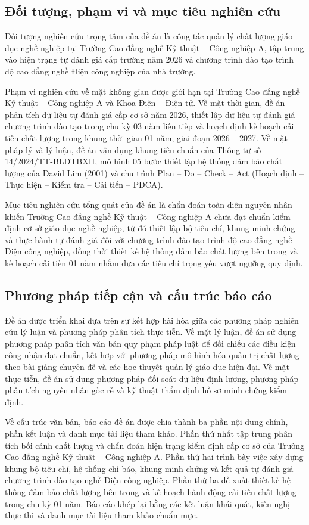 \subsection{Đối tượng, phạm vi và mục tiêu nghiên cứu}

Đối tượng nghiên cứu trọng tâm của đề án là công tác quản lý chất lượng giáo dục nghề nghiệp tại Trường Cao đẳng nghề Kỹ thuật -- Công nghiệp A, tập trung vào hiện trạng tự đánh giá cấp trường năm 2026 và chương trình đào tạo trình độ cao đẳng nghề Điện công nghiệp của nhà trường.

Phạm vi nghiên cứu về mặt không gian được giới hạn tại Trường Cao đẳng nghề Kỹ thuật -- Công nghiệp A và Khoa Điện -- Điện tử. Về mặt thời gian, đề án phân tích dữ liệu tự đánh giá cấp cơ sở năm 2026, thiết lập dữ liệu tự đánh giá chương trình đào tạo trong chu kỳ 03 năm liên tiếp và hoạch định kế hoạch cải tiến chất lượng trong khung thời gian 01 năm, giai đoạn 2026 -- 2027. Về mặt pháp lý và lý luận, đề án vận dụng khung tiêu chuẩn của Thông tư số 14/2024/TT-BLĐTBXH, mô hình 05 bước thiết lập hệ thống đảm bảo chất lượng của David Lim (2001) và chu trình Plan -- Do -- Check -- Act (Hoạch định -- Thực hiện -- Kiểm tra -- Cải tiến -- PDCA).

Mục tiêu nghiên cứu tổng quát của đề án là chẩn đoán toàn diện nguyên nhân khiến Trường Cao đẳng nghề Kỹ thuật -- Công nghiệp A chưa đạt chuẩn kiểm định cơ sở giáo dục nghề nghiệp, từ đó thiết lập bộ tiêu chí, khung minh chứng và thực hành tự đánh giá đối với chương trình đào tạo trình độ cao đẳng nghề Điện công nghiệp, đồng thời thiết kế hệ thống đảm bảo chất lượng bên trong và kế hoạch cải tiến 01 năm nhằm đưa các tiêu chí trọng yếu vượt ngưỡng quy định.

\subsection{Phương pháp tiếp cận và cấu trúc báo cáo}

Đề án được triển khai dựa trên sự kết hợp hài hòa giữa các phương pháp nghiên cứu lý luận và phương pháp phân tích thực tiễn. Về mặt lý luận, đề án sử dụng phương pháp phân tích văn bản quy phạm pháp luật để đối chiếu các điều kiện công nhận đạt chuẩn, kết hợp với phương pháp mô hình hóa quản trị chất lượng theo bài giảng chuyên đề \parencite{lehuytung2024} và các học thuyết quản lý giáo dục hiện đại. Về mặt thực tiễn, đề án sử dụng phương pháp đối soát dữ liệu định lượng, phương pháp phân tích nguyên nhân gốc rễ và kỹ thuật thẩm định hồ sơ minh chứng kiểm định.

Về cấu trúc văn bản, báo cáo đề án được chia thành ba phần nội dung chính, phần kết luận và danh mục tài liệu tham khảo. Phần thứ nhất tập trung phân tích bối cảnh chất lượng và chẩn đoán hiện trạng kiểm định cấp cơ sở của Trường Cao đẳng nghề Kỹ thuật -- Công nghiệp A. Phần thứ hai trình bày việc xây dựng khung bộ tiêu chí, hệ thống chỉ báo, khung minh chứng và kết quả tự đánh giá chương trình đào tạo nghề Điện công nghiệp. Phần thứ ba đề xuất thiết kế hệ thống đảm bảo chất lượng bên trong và kế hoạch hành động cải tiến chất lượng trong chu kỳ 01 năm. Báo cáo khép lại bằng các kết luận khái quát, kiến nghị thực thi và danh mục tài liệu tham khảo chuẩn mực.
